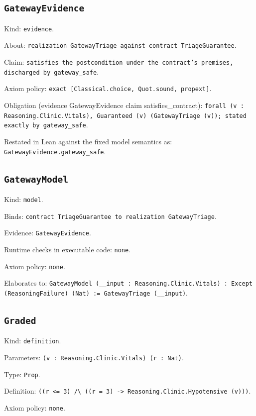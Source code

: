 \documentclass[11pt]{article}
\begin{document}
\subsection*{\texttt{GatewayEvidence}}
\noindent Kind: \texttt{evidence}.\par
\noindent About: \texttt{realization GatewayTriage against contract TriageGuarantee}.\par
\noindent Claim: \texttt{satisfies the postcondition under the contract's premises, discharged by gateway\_safe}.\par
\noindent Axiom policy: \texttt{exact [Classical.choice, Quot.sound, propext]}.\par
\noindent Obligation (evidence GatewayEvidence claim satisfies\_contract): \texttt{forall (v : Reasoning.Clinic.Vitals), Guaranteed (v) (GatewayTriage (v)); stated exactly by gateway\_safe}.\par
\noindent Restated in Lean against the fixed model semantics as: \texttt{GatewayEvidence.gateway\_safe}.\par
\subsection*{\texttt{GatewayModel}}
\noindent Kind: \texttt{model}.\par
\noindent Binds: \texttt{contract TriageGuarantee to realization GatewayTriage}.\par
\noindent Evidence: \texttt{GatewayEvidence}.\par
\noindent Runtime checks in executable code: \texttt{none}.\par
\noindent Axiom policy: \texttt{none}.\par
\noindent Elaborates to: \texttt{GatewayModel (\_\_input : Reasoning.Clinic.Vitals) : Except (ReasoningFailure) (Nat) := GatewayTriage (\_\_input)}.\par
\subsection*{\texttt{Graded}}
\noindent Kind: \texttt{definition}.\par
\noindent Parameters: \texttt{(v : Reasoning.Clinic.Vitals) (r : Nat)}.\par
\noindent Type: \texttt{Prop}.\par
\noindent Definition: \texttt{((r <= 3) /\textbackslash{} ((r = 3) -> Reasoning.Clinic.Hypotensive (v)))}.\par
\noindent Axiom policy: \texttt{none}.\par
\end{document}
